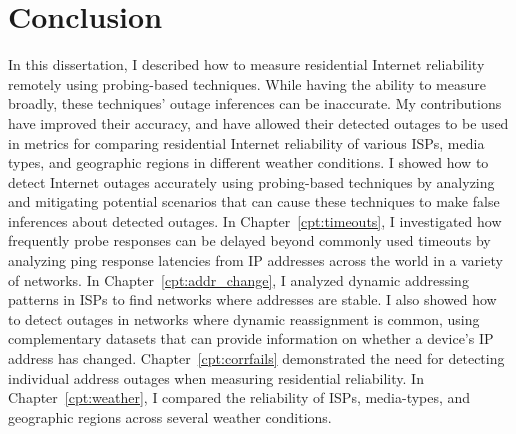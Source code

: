 
\chapter{Conclusion}

In this dissertation, I described how to measure residential Internet
reliability remotely using probing-based techniques. While having the
ability to measure broadly, these techniques' outage inferences can be
inaccurate. My contributions have improved their accuracy, and have
allowed their detected outages to be used in metrics for comparing
residential Internet reliability of various ISPs, media types, and
geographic regions in different weather conditions. I showed how to detect Internet outages accurately using
probing-based techniques by analyzing and mitigating potential
scenarios that can cause these techniques to make false inferences
about detected outages. In Chapter~\ref{cpt:timeouts}, I investigated
how frequently probe responses can be delayed beyond commonly used
timeouts by analyzing ping response latencies from IP
addresses across the world in a variety of networks. In
Chapter~\ref{cpt:addr_change}, I analyzed dynamic addressing patterns
in ISPs to find networks where addresses are stable. I also showed how
to detect outages in networks where dynamic reassignment is common,
using complementary datasets that can provide information on whether a
device's IP address has changed. Chapter~\ref{cpt:corrfails}
demonstrated the need for detecting individual address outages when
measuring residential reliability. In Chapter~\ref{cpt:weather}, I
compared the reliability of ISPs, media-types, and geographic regions
across several weather conditions.


